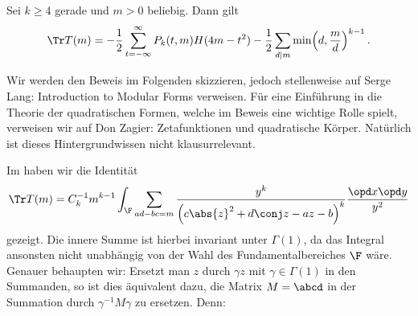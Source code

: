 \begin{theorem}
	Sei $k \geq 4$ gerade und $m > 0$ beliebig. Dann gilt
	\[
		\Tr T(m) = -\frac{1}{2} \sum_{t=-\infty}^\infty P_k(t,m) H(4m-t^2) - \frac{1}{2} \sum_{d|m} \min\Bigl(d, \frac{m}{d}\Bigr)^{k-1}
		\,.
	\]
\end{theorem}

\begin{bewe}
	Wir werden den Beweis im Folgenden skizzieren, jedoch stellenweise auf Serge Lang: \glqq{}Introduction to Modular Forms\grqq{} verweisen. Für eine Einführung in die Theorie der quadratischen Formen, welche im Beweis eine wichtige Rolle spielt, verweisen wir auf Don Zagier: \glqq{}Zetafunktionen und quadratische Körper\grqq{}. Natürlich ist dieses Hintergrundwissen nicht klausurrelevant.

Im  haben wir die Identität
\[
	\Tr T(m) = C_k^{-1} m^{k-1} \int_{\F} \sum_{ad-bc = m} \frac{y^k}{\left(c \abs{z}^2 + d \conj z - az - b\right)^k} \frac{\opd x \opd y}{y^2}
\]
gezeigt. Die innere Summe ist hierbei invariant unter $\Gamma(1)$, da das Integral ansonsten nicht unabhängig von der Wahl des Fundamentalbereiches $\F$ wäre. Genauer behaupten wir: Ersetzt man $z$ durch $\gamma z$ mit $\gamma \in \Gamma(1)$ in den Summanden, so ist dies äquivalent dazu, die Matrix $M = \abcd$ in der Summation durch $\gamma^{-1} M \gamma$ zu ersetzen. Denn: 


\end{bewe}
